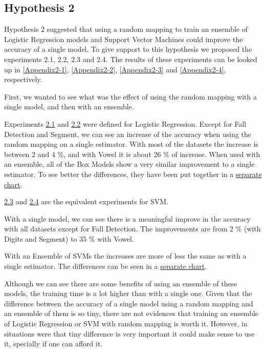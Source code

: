 \begin{pre-delivery}
\section*{Hypothesis 2}
\label{disc:h2}

Hypothesis 2 suggested that using a random mapping to train an ensemble of
Logistic Regression models and Support Vector Machines could improve the
accuracy of a single model. To give support to this hypothesis we proposed
the experiments 2.1, 2.2, 2.3 and 2.4. The results of these experiments
can be looked up in
\ref{Appendix2-1},
\ref{Appendix2-2},
\ref{Appendix2-3} and
\ref{Appendix2-4}, respectively.

First, we wanted to see what was the effect of using the random mapping with
a single model, and then with an ensemble.

Experiments \hyperref[Appendix2-1]{2.1} and \hyperref[Appendix2-3]{2.2} were
defined for Logistic Regression.
Except for Fall Detection and Segment, we can see an increase of the accuracy
when using the random mapping on a single estimator. With most of the datasets
the increase is between 2 and 4 \%, and with Vowel it is about 26 \% of
increase.
When used with an ensemble, all of the Box Models show a very similar
improvement to a single estimator.
To see better the differences, they have been put together in a
\hyperref[2_2:aux]{separate chart}.

\hyperref[Appendix2-3]{2.3} and \hyperref[Appendix2-4]{2.4} are the equivalent
experiments for SVM.

With a single model, we can see there is a
meaningful improve in the accuracy
with all datasets except for Fall Detection. The improvements are from 2 \%
(with Digits and Segment) to 35 \% with Vowel.

With an Ensemble of SVMs the increases are more of less the same as with a
single estimator. The differences can be seen in a \hyperref[2_4:aux]{separate
chart}.

Although we can see there are some benefits of using an ensemble of these models,
the training time is a lot higher than with a single one. Given that the
difference between the accuracy of a single model using a random mapping and
an ensemble of them is so tiny, there are not evidences that training an ensemble
of Logistic Regression or SVM with random mapping is worth it. However, in
situations were that tiny difference is very important it could make sense
to use it, specially if one can afford it.


\end{pre-delivery}
